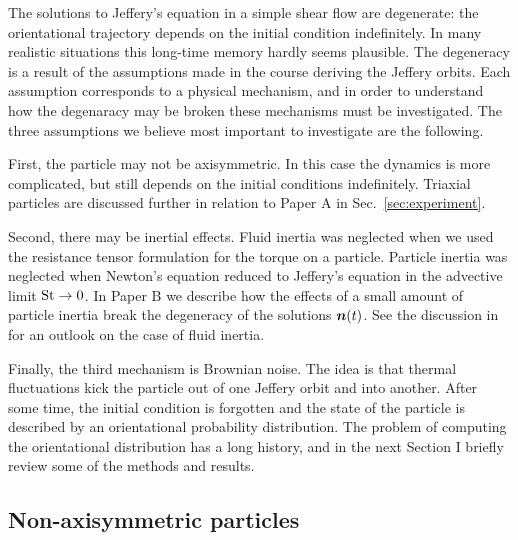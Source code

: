 \documentclass[thesis.tex]{subfiles}
\begin{document}
The solutions to Jeffery's equation in a simple shear flow are degenerate: the orientational trajectory depends on the initial condition indefinitely. In many realistic situations this long-time memory hardly seems plausible. The degeneracy is a result of the assumptions made in the course deriving the Jeffery orbits. Each assumption corresponds to a physical mechanism, and in order to understand how the degenaracy may be broken these mechanisms must be investigated. The three assumptions we believe most important to investigate are the following.

First, the particle may not be axisymmetric. In this case the dynamics is more complicated, but still depends on the initial conditions indefinitely. Triaxial particles are discussed further in relation to Paper A in Sec.~\ref{sec:experiment}.

Second, there may be inertial effects. Fluid inertia was neglected when we used the resistance tensor formulation  for the torque on a particle. Particle inertia was neglected when Newton's equation reduced to Jeffery's equation in the advective limit $\mbox{St} \to 0$. In Paper B we describe how the effects of a small amount of particle inertia break the degeneracy of the solutions $\mbox{\boldmath$n$}(t)$. See the discussion in  for an outlook on the case of fluid inertia.

Finally, the third mechanism is Brownian noise. The idea is that thermal fluctuations kick the particle out of one Jeffery orbit and into another. After some time, the initial condition is forgotten and the state of the particle is described by an orientational probability distribution. The problem of computing the orientational distribution has a long history, and in the next Section I briefly review some of the methods and results.

\subsection{Non-axisymmetric particles}\label{sec:triaxialintro}
\end{document}
